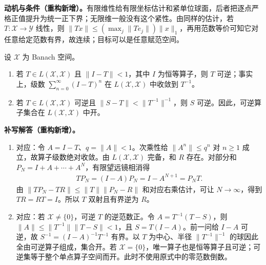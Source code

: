 \documentclass[../../main.tex]{subfiles}
\begin{document}
\begin{remark}
\textbf{动机与条件（重构新增）。}有限维性给有限坐标估计和紧单位球面，后者把逐点严格正值提升为统一正下界；无限维一般没有这个紧性。由同样的估计，若 $T:\mathcal X\to\mathcal Y$ 线性，则 $\|Tx\|\le(\max_j\|Te_j\|)\|x\|_1$，再用范数等价可知它对任意给定范数有界，故连续；目标可以是任意赋范空间。
\end{remark}
\begin{exercise}\label{exercise:ch05-neumann-series}
设 $\mathcal X$ 为 Banach 空间。
\begin{enumerate}
\item\label{item:ch05-neumann-inverse} 若 $T\in L(\mathcal X,\mathcal X)$ 且 $\|I-T\|<1$，其中 $I$ 为恒等算子，则 $T$ 可逆；事实上，级数 $\sum_{n=0}^{\infty}(I-T)^n$ 在 $L(\mathcal X,\mathcal X)$ 中收敛到 $T^{-1}$。
\item\label{item:ch05-neumann-open} 若 $T\in L(\mathcal X,\mathcal X)$ 可逆且 $\|S-T\|<\|T^{-1}\|^{-1}$，则 $S$ 可逆。因此，可逆算子集合在 $L(\mathcal X,\mathcal X)$ 中开。
\end{enumerate}
\end{exercise}
\begin{solution}
\textbf{补写解答（重构新增）。}
\begin{enumerate}
\item 对应：令 $A=I-T$、$q=\|A\|<1$。次乘性给 $\|A^n\|\le q^n$ 对 $n\ge1$ 成立，故算子级数绝对收敛。由 $L(\mathcal X,\mathcal X)$ 完备，和 $R$ 存在。对部分和 $P_N=I+A+\cdots+A^N$，有限望远镜相消得
\begin{align*}
TP_N=(I-A)P_N=I-A^{N+1}=P_NT.
\end{align*}
由 $\|TP_N-TR\|\le\|T\|\|P_N-R\|$ 和对应右乘估计，可让 $N\to\infty$，得到 $TR=RT=I$。所以 $T$ 双射且有界逆为 $R$。
\item 对应：若 $\mathcal X\ne\{0\}$，可逆 $T$ 的逆范数正。令 $A=T^{-1}(T-S)$，则 $\|A\|\le\|T^{-1}\|\|T-S\|<1$，且 $S=T(I-A)$。前一问给 $I-A$ 可逆，故 $S^{-1}=(I-A)^{-1}T^{-1}$ 有界。以 $T$ 为中心、半径 $\|T^{-1}\|^{-1}$ 的球因此全由可逆算子组成，集合开。若 $\mathcal X=\{0\}$，唯一算子也是恒等算子且可逆；可逆集等于整个单点算子空间而开。此时不使用原式中的零范数倒数。
\end{enumerate}
\end{solution}
\end{document}
